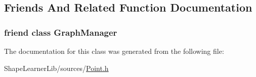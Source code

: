 \subsection{Friends And Related Function Documentation}
\hypertarget{class_point_1_1_access_a4f73c83d7340dc64ca31fa4fdf2ab4b8}{}
\subsubsection[{Graph\+Manager}]{\setlength{\rightskip}{0pt plus 5cm}friend class {\bf Graph\+Manager}\hspace{0.3cm}{\ttfamily [friend]}}\label{class_point_1_1_access_a4f73c83d7340dc64ca31fa4fdf2ab4b8}


The documentation for this class was generated from the following file\+:\begin{DoxyCompactItemize}
\item 
Shape\+Learner\+Lib/sources/\hyperlink{_point_8h}{Point.\+h}\end{DoxyCompactItemize}
